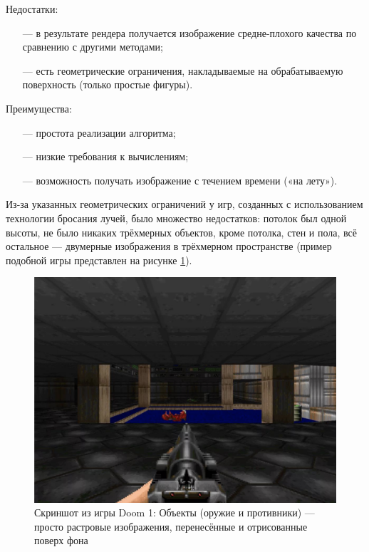 Недостатки:
\begin{itemize}[leftmargin=1.6\parindent]
	\item[---] в результате рендера получается изображение средне-плохого качества по сравнению с другими методами;
	\item[---] есть геометрические ограничения, накладываемые на обрабатываемую поверхность (только простые фигуры).
\end{itemize}

Преимущества:
\begin{itemize}[leftmargin=1.6\parindent]
	\item[---] простота реализации алгоритма;
	\item[---] низкие требования к вычислениям;
	\item[---] возможность получать изображение с течением времени («на лету»).
\end{itemize}

Из-за указанных геометрических ограничений у игр, созданных с 
использованием технологии бросания лучей, было множество недостатков: 
потолок был одной высоты, не было никаких трёхмерных объектов, кроме 
потолка, стен и пола, всё остальное — двумерные изображения в трёхмерном 
пространстве (пример подобной игры представлен на рисунке \ref{fig:doom}). \clearpage

\begin{figure}[h]
	\centering
	\captionsetup{justification=centering}
	\includegraphics[width=120mm]{img/doom.png}
	\caption{Скриншот из игры Doom 1: Объекты (оружие и противники) --- 
		просто растровые изображения, перенесённые и отрисованные поверх фона}
	\label{fig:doom}
\end{figure}


